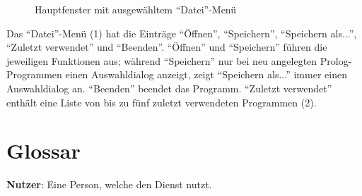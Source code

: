 \documentclass[parskip=full,11pt,twoside]{scrartcl}
\begin{document}
\begin{figure}[hb]
\caption{\label{fig:editor}
    Hauptfenster mit ausgewähltem \enquote{Datei}-Menü
}
\end{figure}

Das \enquote{Datei}-Menü (1) hat die Einträge \enquote{Öffnen}, \enquote{Speichern}, \enquote{Speichern als...}, \enquote{Zuletzt verwendet} und \enquote{Beenden}.
\enquote{Öffnen} und \enquote{Speichern} führen die jeweiligen Funktionen aus; während \enquote{Speichern} nur bei neu angelegten Prolog-Programmen einen Auswahldialog anzeigt, zeigt \enquote{Speichern als...} immer einen Auswahldialog an.
\enquote{Beenden} beendet das Programm.
\enquote{Zuletzt verwendet} enthält eine Liste von bis zu fünf zuletzt verwendeten Programmen (2).

\section{Glossar}

\textbf{Nutzer}:
Eine Person, welche den Dienst nutzt.
\end{document}
